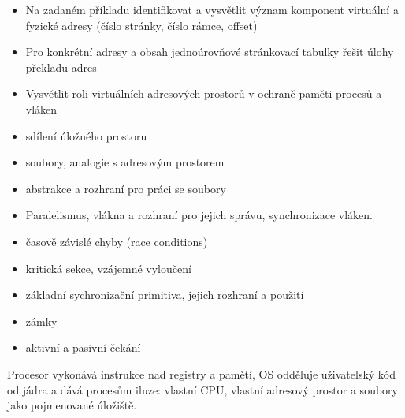 \begin{tema}
\begin{itemize}[leftmargin=1.2em,itemsep=0pt,topsep=1pt]
  \item Na zadaném příkladu identifikovat a vysvětlit význam komponent virtuální a fyzické adresy (číslo stránky, číslo rámce, offset)
  \item Pro konkrétní adresy a obsah jednoúrovňové stránkovací tabulky řešit úlohy překladu adres
  \item Vysvětlit roli virtuálních adresových prostorů v ochraně paměti procesů a vláken
  \item sdílení úložného prostoru
  \item soubory, analogie s adresovým prostorem
  \item abstrakce a rozhraní pro práci se soubory
  \item Paralelismus, vlákna a rozhraní pro jejich správu, synchronizace vláken.
  \item časově závislé chyby (race conditions)
  \item kritická sekce, vzájemné vyloučení
  \item základní sychronizační primitiva, jejich rozhraní a použití
  \item zámky
  \item aktivní a pasivní čekání
\end{itemize}
\end{tema}
\begin{vezkratce}
\end{vezkratce}

\ucivo
\begin{intuice}
Procesor vykonává instrukce nad registry a pamětí, OS odděluje uživatelský kód od jádra
a dává procesům iluze: vlastní CPU, vlastní adresový prostor a soubory jako pojmenované
úložiště.
\end{intuice}

